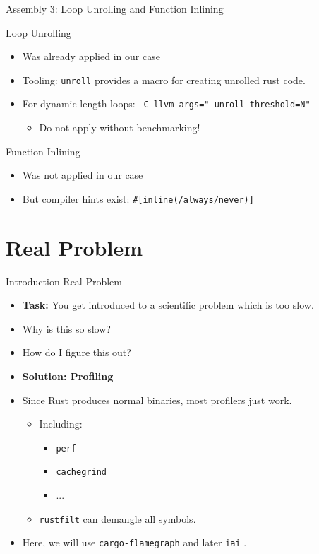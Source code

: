 \documentclass[compress,aspectratio=169]{beamer}
\begin{document}
\begin{frame}{Assembly 3: Loop Unrolling and Function Inlining}
  \begin{block}{Loop Unrolling}
    \begin{itemize}
      \item Was already applied in our case
      \item Tooling: \texttt{unroll} \cite{unroll} provides a macro for creating unrolled rust code.
      \item For dynamic length loops: \texttt{-C llvm-args="-unroll-threshold=N"}
        \begin{itemize}
          \item Do not apply without benchmarking!
        \end{itemize}
    \end{itemize}
  \end{block}
      \pause
  \begin{block}{Function Inlining}
    \begin{itemize}
      \item Was not applied in our case
      \item But compiler hints exist: \texttt{\#[inline(/always/never)]} \cite{perfbook}
    \end{itemize}
  \end{block}
\end{frame}

\section{Real Problem}

\begin{frame}{Introduction Real Problem}
  \begin{itemize}
    \item \textbf{Task:} You get introduced to a scientific problem which is too slow.
      \pause
    \item Why is this so slow?
      \pause
    \item How do I figure this out?
      \pause
    \item \textbf{Solution: Profiling}
      \pause
    \item Since Rust produces normal binaries, most profilers just work.
      \begin{itemize}
        \item Including:
          \begin{itemize}
            \item \texttt{perf} \cite{perfwiki}
            \item \texttt{cachegrind} \cite{valgrind}
            \item ...
          \end{itemize}
        \item \texttt{rustfilt} \cite{rustfilt} can demangle all symbols.
      \end{itemize}
      \pause
    \item Here, we will use \texttt{cargo-flamegraph} \cite{cargoflamegraph} and later \texttt{iai} \cite{iai}.
  \end{itemize}
\end{frame}
\end{document}
